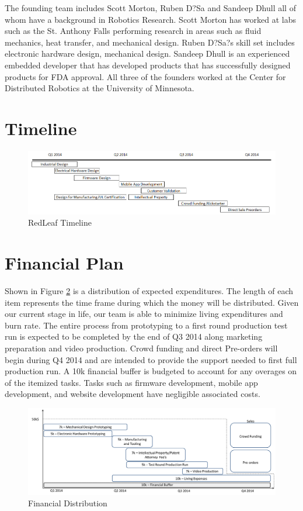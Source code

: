 \documentclass[11pt]{article}
\theoremstyle{definition}
\begin{document}
The founding team includes Scott Morton, Ruben D?Sa and Sandeep Dhull all of whom have a background in Robotics Research. Scott Morton has worked at labs such as the St. Anthony Falls performing research in areas such as fluid mechanics, heat transfer, and mechanical design. Ruben D?Sa?s skill set includes electronic hardware design, mechanical design. Sandeep Dhull is an experienced embedded developer that has developed products that has successfully designed products for FDA approval. All three of the founders worked at the Center for Distributed Robotics at the University of Minnesota. 


\section{Timeline}

\begin{figure}
\centering
\includegraphics[scale=.65]{rl_schedule.png}
\caption{RedLeaf Timeline}
\label{fig:rl_schedule}
\end{figure}


\section{Financial Plan}

Shown in Figure \ref{fig:financial} is a distribution of expected expenditures. The length of each item represents the time frame during which the money will be distributed. Given our current stage in life, our team is able to minimize living expenditures and burn rate. The entire process from prototyping to a first round production test run is expected to be completed by the end of Q3 2014 along marketing preparation and video production. Crowd funding and direct Pre-orders will begin during Q4 2014 and are intended to provide the support needed to first full production run. A 10k financial buffer is budgeted to account for any overages on of the itemized tasks. Tasks such as firmware development, mobile app development, and website development have negligible associated costs.  

\begin{figure}
\centering
\includegraphics[scale=.6,width=6in]{financial_dist.png}
\caption{Financial Distribution}
\label{fig:financial}
\end{figure}
\end{document}
